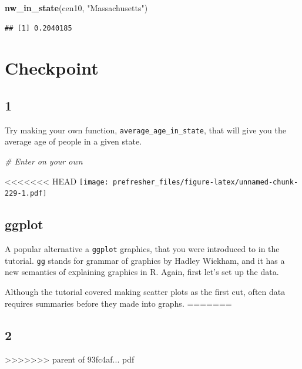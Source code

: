 \documentclass[]{book}
\newenvironment{Shaded}{\begin{snugshade}}{\end{snugshade}}
\newcommand{\CommentTok}[1]{\textcolor[rgb]{0.56,0.35,0.01}{\textit{#1}}}
\newcommand{\KeywordTok}[1]{\textcolor[rgb]{0.13,0.29,0.53}{\textbf{#1}}}
\newcommand{\NormalTok}[1]{#1}
\newcommand{\StringTok}[1]{\textcolor[rgb]{0.31,0.60,0.02}{#1}}
\theoremstyle{definition}
\theoremstyle{definition}
\theoremstyle{definition}
\theoremstyle{remark}
\begin{document}
\begin{Shaded}
\begin{Highlighting}[]
\begin{Shaded}
\begin{Highlighting}[]
\begin{Shaded}
\begin{Highlighting}[]
\begin{Shaded}
\begin{Highlighting}[]
\KeywordTok{nw_in_state}\NormalTok{(cen10, }\StringTok{"Massachusetts"}\NormalTok{)}
\end{Highlighting}
\end{Shaded}

\begin{verbatim}
## [1] 0.2040185
\end{verbatim}

\hypertarget{checkpoint-1}{%
\section*{Checkpoint}\label{checkpoint-1}}

\hypertarget{section-14}{%
\subsection*{1}\label{section-14}}

Try making your own function, \texttt{average\_age\_in\_state}, that will give you the average age of people in a given state.

\begin{Shaded}
\begin{Highlighting}[]
\CommentTok{# Enter on your own}
\end{Highlighting}
\end{Shaded}

<<<<<<< HEAD
\texttt{[image: prefresher\_files/figure-latex/unnamed-chunk-229-1.pdf]}

\hypertarget{ggplot}{%
\subsection{ggplot}\label{ggplot}}

A popular alternative a \texttt{ggplot} graphics, that you were introduced to in the tutorial. \texttt{gg} stands for grammar of graphics by Hadley Wickham, and it has a new semantics of explaining graphics in R. Again, first let's set up the data.

Although the tutorial covered making scatter plots as the first cut, often data requires summaries before they made into graphs.
=======
\hypertarget{section-15}{%
\subsection*{2}\label{section-15}}
>>>>>>> parent of 93fc4af... pdf


\end{Highlighting}
\end{Shaded}
\end{Highlighting}
\end{Shaded}
\end{Highlighting}
\end{Shaded}
\end{document}
